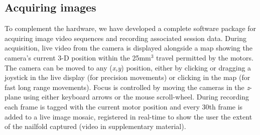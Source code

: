 \documentclass[runningheads,a4paper]{llncs}
\def\eg{e.g.}
\def\etc{etc.}
\begin{document}
\subsection{Acquiring images}
%
To complement the hardware, we have developed a complete software package for acquiring image video sequences and recording associated session data. During acquisition, live video from the camera is displayed alongside a map showing the camera’s current 3-D position within the 25mm$^3$ travel permitted by the motors. The camera can be moved to any (\textit{x,y}) position, either by clicking or dragging a joystick in the live display (for precision movements) or clicking in the map (for fast long range movements). Focus is controlled by moving the cameras in the \textit{z}-plane using either keyboard arrows or the mouse scroll-wheel. During recording each frame is tagged with the current motor position and every 30th frame is added to a live image mosaic, registered in real-time to show the user the extent of the nailfold captured (video in supplementary material). %
%
\end{document}
